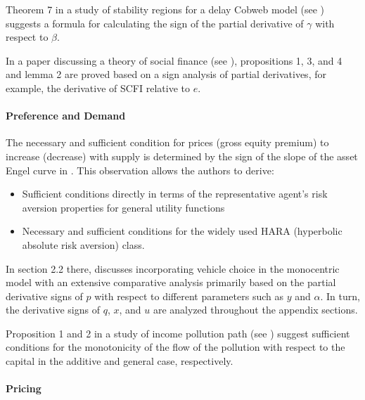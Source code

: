\documentclass[11pt]{book}
\begin{document}
Theorem 7 in a study of stability regions for a delay Cobweb model (see \cite{matsumoto2016stability}) suggests a formula for
calculating the sign of the partial derivative of $\gamma$ with respect
to $\beta$.

In a paper discussing a theory of social finance (see \cite{cornee2018theory}), propositions 1, 3, and 4 and lemma 2
are proved based on a sign analysis of partial derivatives, for example,
the derivative of SCFI relative to $e$.


\paragraph{Preference and Demand}

The necessary and sufficient condition for prices (gross equity premium)
to increase (decrease) with supply is determined by the sign of the
slope of the asset Engel curve in \cite{kubler2011theory}. This observation
allows the authors to derive:
\begin{itemize}
\item Sufficient conditions directly in terms of the representative agent's
risk aversion properties for general utility functions
\item Necessary and sufficient conditions for the widely used HARA (hyperbolic
absolute risk aversion) class.
\end{itemize}

In section 2.2 there, \cite{kim2012endogenous} discusses incorporating
vehicle choice in the monocentric model with an extensive comparative
analysis primarily based on the partial derivative signs of $p$ with
respect to different parameters such as $y$ and $\alpha$. In turn,
the derivative signs of $q$, $x$, and $u$ are analyzed throughout
the appendix sections.

Proposition 1 and 2 in a study of income pollution path (see \cite{figueroa2015beyond}) suggest sufficient
conditions for the monotonicity of the flow of the pollution with
respect to the capital in the additive and general case, respectively.


\paragraph{Pricing}
\end{document}
